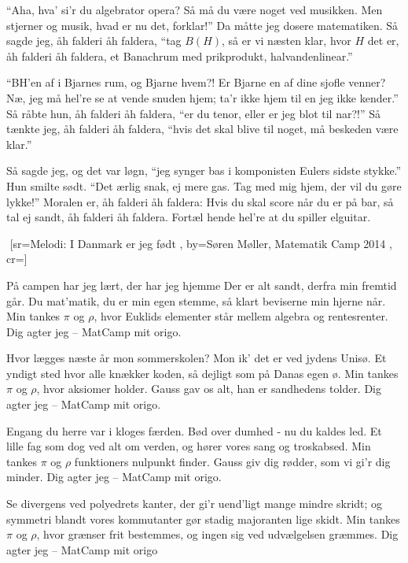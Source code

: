 \documentclass[pdftex,12pt]{article}
\begin{document}
\begin{songs}{}
\endverse
\beginverse
``Aha, hva' si’r du algebrator opera?
Så må du være noget ved musikken.
Men stjerner og musik, hvad er nu det, forklar!''
Da måtte jeg dosere matematiken.
Så sagde jeg, åh falderi åh faldera,
``tag $B(H)$, så er vi næsten klar,
hvor $H$ det er, åh falderi åh faldera,
et Banachrum med prikprodukt, halvandenlinear.''

\endverse
\beginverse
``BH'en af i Bjarnes rum, og Bjarne hvem?!
Er Bjarne en af dine sjofle venner?
Næ, jeg må hel're se at vende snuden hjem;
ta'r ikke hjem til en jeg ikke kender.''
Så råbte hun, åh falderi åh faldera,
``er du tenor, eller er jeg blot til nar?!''
Så tænkte jeg, åh falderi åh faldera,
``hvis det skal blive til noget, må beskeden være klar.''

\endverse
\beginverse
Så sagde jeg, og det var løgn, ``jeg synger bas
i komponisten Eulers sidste stykke.''
Hun smilte sødt. ``Det ærlig snak, ej mere gas.
Tag med mig hjem, der vil du gøre lykke!''
Moralen er, åh falderi åh faldera:
Hvis du skal score når du er på bar,
så tal ej sandt, åh falderi åh faldera.
Fortæl hende hel're at du spiller elguitar.

\endverse
\endsong



﻿%
[sr={Melodi: I Danmark er jeg født}
,
by={Søren Møller, Matematik Camp 2014}
,
cr={}]\hypertarget{Hymne til Matematik Camp}{}
\label{song3}

\beginverse
På campen har jeg lært, der har jeg hjemme
Der er alt sandt, derfra min fremtid går.
Du mat'matik, du er min egen stemme,
så klart beviserne min hjerne når.
Min tankes $\pi$ og $\rho$,
hvor Euklids elementer
står mellem algebra og rentesrenter.
Dig agter jeg -- MatCamp mit origo.
\endverse

\beginverse
Hvor lægges næste år mon sommerskolen?
Mon ik' det er ved jydens Unisø.
Et yndigt sted hvor alle knækker koden,
så dejligt som på Danas egen ø.
Min tankes $\pi$ og $\rho$,
hvor aksiomer holder.
Gauss gav os alt, han er sandhedens tolder.
Dig agter jeg -- MatCamp mit origo.
\endverse

\beginverse
Engang du herre var i kloges færden.
Bød over dumhed - nu du kaldes led.
Et lille fag som dog ved alt om verden,
og hører vores sang og troskabsed.
Min tankes $\pi$ og $\rho$
funktioners nulpunkt finder.
Gauss giv dig rødder, som vi gi'r dig minder.
Dig agter jeg -- MatCamp mit origo.
\endverse

\beginverse
Se divergens ved polyedrets kanter,
der gi'r uend'ligt mange mindre skridt;
og symmetri blandt vores kommutanter
gør stadig majoranten lige skidt.
Min tankes $\pi$ og $\rho$,
hvor grænser frit bestemmes,
og ingen sig ved udvælgelsen græmmes.
Dig agter jeg -- MatCamp mit origo
\endverse


\end{songs}
\end{document}
